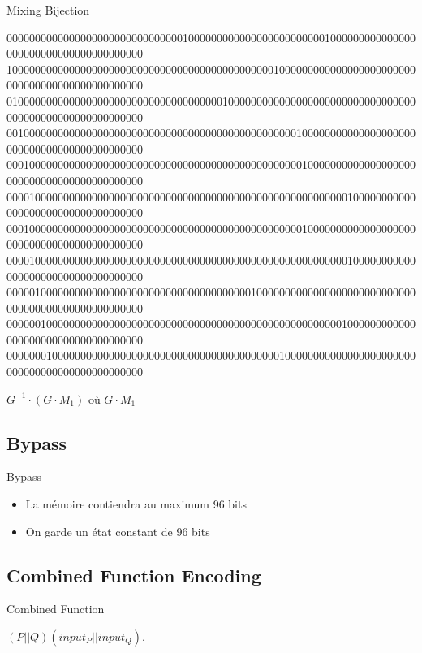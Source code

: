 \documentclass{beamer}
\begin{document}
\begin{frame}{Mixing Bijection}

\begin{center}

{\tiny
000000000000000000000000000000010000000000000000000000001000000000000000000000000000000000000000
100000000000000000000000000000000000000000000001000000000000000000000000000000000000000000000000
010000000000000000000000000000000000001000000000000000000000000000000000000000000000000000000000
001000000000000000000000000000000000000000000000000100000000000000000000000000000000000000000000
000100000000000000000000000000000000000000000000000010000000000000000000000000000000000000000000
000010000000000000000000000000000000000000000000000000000000100000000000000000000000000000000000
000100000000000000000000000000000000000000000000000010000000000000000000000000000000000000000000
000010000000000000000000000000000000000000000000000000000000100000000000000000000000000000000000
000001000000000000000000000000000000000000010000000000000000000000000000000000000000000000000000
000000100000000000000000000000000000000000000000000000000001000000000000000000000000000000000000
000000010000000000000000000000000000000000000000100000000000000000000000000000000000000000000000
}

$G^{-1} \cdot (G \cdot M_1)$ où $G \cdot M_1$
\end{center}

\end{frame}

\subsection{Bypass}

\begin{frame}{Bypass}
\begin{itemize}
\item La mémoire contiendra au maximum 96 bits
\item On garde un état constant de 96 bits
\end{itemize}

\end{frame}


\subsection{Combined Function Encoding}

\begin{frame}{Combined Function}
  \begin{center}
    $(P||Q)(input_P||input_Q)$.
  \end{center}
\end{frame}
\end{document}
